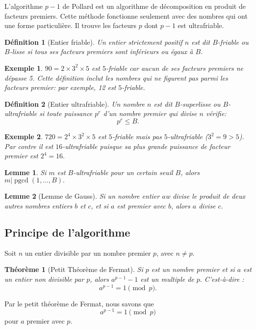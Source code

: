 \documentclass[french, 12pt, titlepage]{article}
\DeclareMathOperator{\pgcd}{pgcd}
\newtheorem{definition}{D{\'e}finition}
\newtheorem{theoreme}{Th{\'e}or{\`e}me}
\newtheorem{lemme}{Lemme}
\newtheorem{example}{Exemple}
\begin{document}
L'algorithme $p-1$ de Pollard est un algorithme de décomposition en produit de facteurs premiers. Cette méthode fonctionne seulement avec des nombres qui ont une forme particulière. Il trouve les facteurs $p$ dont $p-1$ est ultrafriable.

\begin{definition}[Entier friable]
Un entier strictement positif $n$ est dit $B$-friable ou $B$-lisse si tous ses facteurs premiers sont inférieurs ou égaux à $B.$ 
\end{definition}
\begin{example}
$90 = 2 \times 3^2 \times 5$ est $5$-friable car aucun de ses facteurs premiers ne dépasse 5.
Cette définition inclut les nombres qui ne figurent pas parmi les facteurs premier: par exemple, 12 est $5$-friable.
\end{example}
\begin{definition}[Entier ultrafriable]
Un nombre $n$ est dit $B$-superlisse ou $B$-ultrafriable si toute puissance $p^r$ d'un nombre premier qui divise $n$ vérifie: \[ p^r \leq B .\]
\end{definition}
\begin{example}
$720 = 2^4 \times 3^2 \times 5$ est $5$-friable mais pas $5$-ultrafriable ($3^2 = 9 > 5$). Par contre il est $16$-ultrafriable puisque sa plus grande puissance de facteur premier est $2^4 = 16.$
\end{example}

\begin{lemme}\label{leme}
Si $m$ est $B$-ultrafriable pour un certain seuil $B$, alors $m | \pgcd(1,...,B).$
\end{lemme}

\begin{lemme}[Lemme de Gauss]
Si un nombre entier $a$w divise le produit de deux autres nombres entiers $b$ et $c$, et si $a$ est premier avec $b$, alors $a$ divise $c.$
\end{lemme}

\subsection{Principe de l'algorithme}

Soit $n$ un entier divisible par un nombre premier $p$, avec $n \neq p.$ 

\begin{theoreme}[Petit Théorème de Fermat]
Si $p$ est un nombre premier et si $a$ est un entier non divisible par $p$, alors $a^{p-1} - 1$ est un multiple de $p.$ C'est-à-dire : \[a^{p-1} = 1 \pmod p .\]
\end{theoreme}
Par le petit théorème de Fermat, nous savons que \[a^{p-1} = 1 \pmod p \] pour $a$ premier avec $p.$ 
\end{document}
